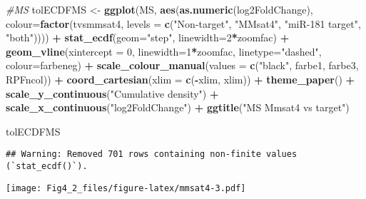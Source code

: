 \documentclass[
]{article}
\newenvironment{Shaded}{\begin{snugshade}}{\end{snugshade}}
\newcommand{\AttributeTok}[1]{\textcolor[rgb]{0.13,0.29,0.53}{#1}}
\newcommand{\CommentTok}[1]{\textcolor[rgb]{0.56,0.35,0.01}{\textit{#1}}}
\newcommand{\DecValTok}[1]{\textcolor[rgb]{0.00,0.00,0.81}{#1}}
\newcommand{\FunctionTok}[1]{\textcolor[rgb]{0.13,0.29,0.53}{\textbf{#1}}}
\newcommand{\NormalTok}[1]{#1}
\newcommand{\OtherTok}[1]{\textcolor[rgb]{0.56,0.35,0.01}{#1}}
\newcommand{\SpecialCharTok}[1]{\textcolor[rgb]{0.81,0.36,0.00}{\textbf{#1}}}
\newcommand{\StringTok}[1]{\textcolor[rgb]{0.31,0.60,0.02}{#1}}
\begin{document}
\begin{Shaded}
\begin{Highlighting}[]
\CommentTok{\#MS}
\NormalTok{tolECDFMS }\OtherTok{\textless{}{-}} \FunctionTok{ggplot}\NormalTok{(MS, }\FunctionTok{aes}\NormalTok{(}\FunctionTok{as.numeric}\NormalTok{(log2FoldChange), }\AttributeTok{colour=}\FunctionTok{factor}\NormalTok{(tvsmmsat4, }\AttributeTok{levels =} \FunctionTok{c}\NormalTok{(}\StringTok{"Non{-}target"}\NormalTok{, }\StringTok{"MMsat4"}\NormalTok{, }\StringTok{"miR{-}181 target"}\NormalTok{, }\StringTok{"both"}\NormalTok{)))) }\SpecialCharTok{+} 
  \FunctionTok{stat\_ecdf}\NormalTok{(}\AttributeTok{geom=}\StringTok{"step"}\NormalTok{, }\AttributeTok{linewidth=}\DecValTok{2}\SpecialCharTok{*}\NormalTok{zoomfac) }\SpecialCharTok{+}
  \FunctionTok{geom\_vline}\NormalTok{(}\AttributeTok{xintercept =} \DecValTok{0}\NormalTok{, }\AttributeTok{linewidth=}\DecValTok{1}\SpecialCharTok{*}\NormalTok{zoomfac, }\AttributeTok{linetype=}\StringTok{"dashed"}\NormalTok{, }\AttributeTok{colour=}\NormalTok{farbeneg) }\SpecialCharTok{+}
  \FunctionTok{scale\_colour\_manual}\NormalTok{(}\AttributeTok{values =} \FunctionTok{c}\NormalTok{(}\StringTok{"black"}\NormalTok{, farbe1, farbe3, RPFncol)) }\SpecialCharTok{+}
  \FunctionTok{coord\_cartesian}\NormalTok{(}\AttributeTok{xlim =} \FunctionTok{c}\NormalTok{(}\SpecialCharTok{{-}}\NormalTok{xlim, xlim)) }\SpecialCharTok{+} 
  \FunctionTok{theme\_paper}\NormalTok{() }\SpecialCharTok{+}
  \FunctionTok{scale\_y\_continuous}\NormalTok{(}\StringTok{"Cumulative density"}\NormalTok{) }\SpecialCharTok{+} \FunctionTok{scale\_x\_continuous}\NormalTok{(}\StringTok{"log2FoldChange"}\NormalTok{) }\SpecialCharTok{+}
  \FunctionTok{ggtitle}\NormalTok{(}\StringTok{"MS Mmsat4 vs target"}\NormalTok{)}

\NormalTok{tolECDFMS}
\end{Highlighting}
\end{Shaded}

\begin{verbatim}
## Warning: Removed 701 rows containing non-finite values (`stat_ecdf()`).
\end{verbatim}

\texttt{[image: Fig4\_2\_files/figure-latex/mmsat4-3.pdf]}
\end{document}
